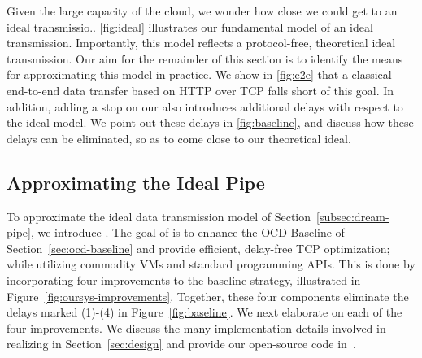 
 Given the large capacity of the cloud, we wonder how close we could get to an ideal transmissio..
\autoref{fig:ideal} illustrates our fundamental model of an ideal transmission. Importantly, this model reflects a protocol-free, theoretical ideal transmission. Our aim for the remainder of this section is to identify the means for approximating this model in practice. We show in \autoref{fig:e2e} that a classical end-to-end data transfer based on HTTP over TCP falls short 
of this goal. In addition, adding a stop on our  also introduces additional delays with respect to the ideal model. We point out these delays in \autoref{fig:baseline}, and discuss how these delays can be eliminated, so as to come close to our theoretical ideal.


\subsection{Approximating the Ideal Pipe}\label{sec:approx}

To approximate the ideal data transmission model of Section~\ref{subsec:dream-pipe}, we introduce \textit{\oursys}.
The goal of \oursys is to enhance the OCD Baseline of Section~\ref{sec:ocd-baseline} and provide efficient, delay-free TCP optimization; while utilizing commodity VMs and standard programming APIs. This is done by incorporating four improvements to the baseline strategy, illustrated in Figure~\ref{fig:oursys-improvements}. Together, these four components eliminate the delays marked (1)-(4) in Figure~\ref{fig:baseline}. We next elaborate on each of the four improvements. We discuss the many implementation details involved in realizing \oursys in Section~\ref{sec:design} and provide our open-source code in~\cite{ktcp}.

